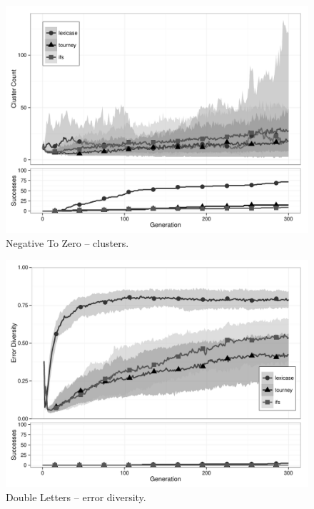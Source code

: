 \begin{figure}[p] %
\centering
\includegraphics[width=11.5cm]{negative-to-zero-cluster.pdf}
\caption{Negative To Zero -- clusters.}
\label{negative-to-zeroClu}
\end{figure}

\begin{figure}[p] %
\centering
\includegraphics[width=11.5cm]{double-letters-diversity.pdf}
\caption{Double Letters -- error diversity.}
\label{double-lettersDiv}
\end{figure}

